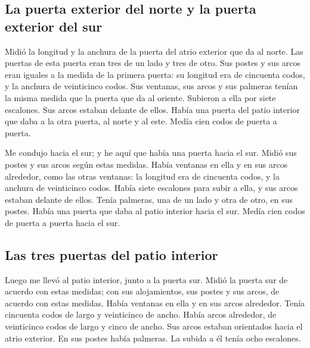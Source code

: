 \begin{paracol}{2}
\hypertarget{la-puerta-exterior-del-norte-y-la-puerta-exterior-del-sur}{%
\subsection{La puerta exterior del norte y la puerta exterior del
sur}\label{la-puerta-exterior-del-norte-y-la-puerta-exterior-del-sur}}

 Midió la longitud y la anchura de la puerta del atrio
exterior que da al norte.  Las puertas de esta puerta
eran tres de un lado y tres de otro. Sus postes y sus arcos eran iguales
a la medida de la primera puerta: su longitud era de cincuenta codos, y
la anchura de veinticinco codos.  Sus ventanas, sus arcos
y sus palmeras tenían la misma medida que la puerta que da al oriente.
Subieron a ella por siete escalones. Sus arcos estaban delante de ellos.
 Había una puerta del patio interior que daba a la otra
puerta, al norte y al este. Medía cien codos de puerta a puerta.

 Me condujo hacia el sur; y he aquí que había una puerta
hacia el sur. Midió sus postes y sus arcos según estas medidas.
 Había ventanas en ella y en sus arcos alrededor, como
las otras ventanas: la longitud era de cincuenta codos, y la anchura de
veinticinco codos.  Había siete escalones para subir a
ella, y sus arcos estaban delante de ellos. Tenía palmeras, una de un
lado y otra de otro, en sus postes.  Había una puerta que
daba al patio interior hacia el sur. Medía cien codos de puerta a puerta
hacia el sur.

\hypertarget{las-tres-puertas-del-patio-interior}{%
\subsection{Las tres puertas del patio
interior}\label{las-tres-puertas-del-patio-interior}}

 Luego me llevó al patio interior, junto a la puerta sur.
Midió la puerta sur de acuerdo con estas medidas;  con
sus alojamientos, sus postes y sus arcos, de acuerdo con estas medidas.
Había ventanas en ella y en sus arcos alrededor. Tenía cincuenta codos
de largo y veinticinco de ancho.  Había arcos alrededor,
de veinticinco codos de largo y cinco de ancho.  Sus
arcos estaban orientados hacia el atrio exterior. En sus postes había
palmeras. La subida a él tenía ocho escalones.


\end{paracol}
